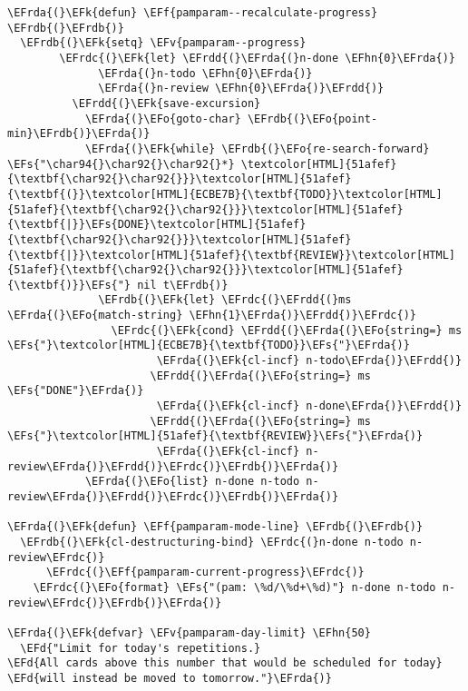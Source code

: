 \documentclass[a4wide,10pt]{article}
\newcommand{\EFs}[1]{\textcolor{EFs}{#1}} %
\newcommand{\EFd}[1]{\textcolor{EFd}{#1}} %
\newcommand{\EFk}[1]{\textcolor{EFk}{#1}} %
\newcommand{\EFf}[1]{\textcolor{EFf}{#1}} %
\newcommand{\EFv}[1]{\textcolor{EFv}{#1}} %
\newcommand{\EFo}[1]{\textcolor{EFo}{#1}} %
\newcommand{\EFhn}[1]{\textcolor{EFhn}{\textbf{#1}}} %
\newcommand{\EFrda}[1]{\textcolor{EFrda}{#1}} %
\newcommand{\EFrdb}[1]{\textcolor{EFrdb}{#1}} %
\newcommand{\EFrdc}[1]{\textcolor{EFrdc}{#1}} %
\newcommand{\EFrdd}[1]{\textcolor{EFrdd}{#1}} %
\begin{document}
\begin{Code}
\begin{Verbatim}
\EFrda{(}\EFk{defun} \EFf{pamparam--recalculate-progress} \EFrdb{(}\EFrdb{)}
  \EFrdb{(}\EFk{setq} \EFv{pamparam--progress}
        \EFrdc{(}\EFk{let} \EFrdd{(}\EFrda{(}n-done \EFhn{0}\EFrda{)}
              \EFrda{(}n-todo \EFhn{0}\EFrda{)}
              \EFrda{(}n-review \EFhn{0}\EFrda{)}\EFrdd{)}
          \EFrdd{(}\EFk{save-excursion}
            \EFrda{(}\EFo{goto-char} \EFrdb{(}\EFo{point-min}\EFrdb{)}\EFrda{)}
            \EFrda{(}\EFk{while} \EFrdb{(}\EFo{re-search-forward} \EFs{"\char94{}\char92{}\char92{}*} \textcolor[HTML]{51afef}{\textbf{\char92{}\char92{}}}\textcolor[HTML]{51afef}{\textbf{(}}\textcolor[HTML]{ECBE7B}{\textbf{TODO}}\textcolor[HTML]{51afef}{\textbf{\char92{}\char92{}}}\textcolor[HTML]{51afef}{\textbf{|}}\EFs{DONE}\textcolor[HTML]{51afef}{\textbf{\char92{}\char92{}}}\textcolor[HTML]{51afef}{\textbf{|}}\textcolor[HTML]{51afef}{\textbf{REVIEW}}\textcolor[HTML]{51afef}{\textbf{\char92{}\char92{}}}\textcolor[HTML]{51afef}{\textbf{)}}\EFs{"} nil t\EFrdb{)}
              \EFrdb{(}\EFk{let} \EFrdc{(}\EFrdd{(}ms \EFrda{(}\EFo{match-string} \EFhn{1}\EFrda{)}\EFrdd{)}\EFrdc{)}
                \EFrdc{(}\EFk{cond} \EFrdd{(}\EFrda{(}\EFo{string=} ms \EFs{"}\textcolor[HTML]{ECBE7B}{\textbf{TODO}}\EFs{"}\EFrda{)}
                       \EFrda{(}\EFk{cl-incf} n-todo\EFrda{)}\EFrdd{)}
                      \EFrdd{(}\EFrda{(}\EFo{string=} ms \EFs{"DONE"}\EFrda{)}
                       \EFrda{(}\EFk{cl-incf} n-done\EFrda{)}\EFrdd{)}
                      \EFrdd{(}\EFrda{(}\EFo{string=} ms \EFs{"}\textcolor[HTML]{51afef}{\textbf{REVIEW}}\EFs{"}\EFrda{)}
                       \EFrda{(}\EFk{cl-incf} n-review\EFrda{)}\EFrdd{)}\EFrdc{)}\EFrdb{)}\EFrda{)}
            \EFrda{(}\EFo{list} n-done n-todo n-review\EFrda{)}\EFrdd{)}\EFrdc{)}\EFrdb{)}\EFrda{)}

\EFrda{(}\EFk{defun} \EFf{pamparam-mode-line} \EFrdb{(}\EFrdb{)}
  \EFrdb{(}\EFk{cl-destructuring-bind} \EFrdc{(}n-done n-todo n-review\EFrdc{)}
      \EFrdc{(}\EFf{pamparam-current-progress}\EFrdc{)}
    \EFrdc{(}\EFo{format} \EFs{"(pam: \%d/\%d+\%d)"} n-done n-todo n-review\EFrdc{)}\EFrdb{)}\EFrda{)}

\EFrda{(}\EFk{defvar} \EFv{pamparam-day-limit} \EFhn{50}
  \EFd{"Limit for today's repetitions.}
\EFd{All cards above this number that would be scheduled for today}
\EFd{will instead be moved to tomorrow."}\EFrda{)}


\end{Verbatim}
\end{Code}
\end{document}
